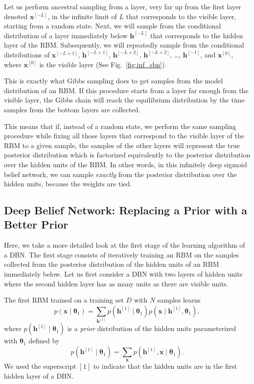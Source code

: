 \documentclass{now}
\newcommand{\qlay}[1]{\left[#1\right]}
\newcommand{\vect}[1]{\mathbf{#1}}
\newcommand{\vects}[1]{\boldsymbol{#1}}
\newcommand{\vh}[0]{\vect{h}}
\newcommand{\vx}[0]{\vect{x}}
\newcommand{\TT}[0]{{\vects{\theta}}}
\begin{document}
Let us perform ancestral sampling from a layer, very far up
from the first layer denoted $\vx^{\qlay{-L}}$, in the infinite
limit of $L$ that corresponds
to the visible layer, starting from a random state.  Next,
we will sample from the conditional distribution of a layer
immediately below $\vh^{\qlay{-L}}$ that corresponds to the
hidden layer of the RBM. Subsequently, we will repeatedly
sample from the conditional distributions of $\vx^{\qlay{-L+1}}$,
$\vh^{\qlay{-L+1}}$, $\vh^{\qlay{-L+2}}$, $\vh^{\qlay{-L+2}}$, \dots,
$\vh^{\qlay{-1}}$, and $\vx^{\qlay{0}}$, where $\vx^{\qlay{0}}$ is the
visible layer (See Fig.~\ref{fig:inf_sbn}). 

This is exactly what Gibbs sampling
does to get samples from the model distribution of an RBM.
If this procedure starts from a layer far enough from the
visible layer, the Gibbs chain will reach the equilibrium
distribution by the time samples from the bottom layers are
collected. 

This means that if, instead of a random state, we perform
the same sampling procedure while fixing all those layers
that correspond to the visible layer of the RBM to a given
sample, the samples of the other layers will represent the
true posterior distribution which is factorized equivalently
to the posterior distribution over the hidden units of the
RBM. In other words, in this infinitely deep sigmoid belief
network, we can sample \textit{exactly} from the posterior
distribution over the hidden units, because the weights are
tied.

\subsection{Deep Belief Network: Replacing a Prior with a
Better Prior}
\label{sec:dbn_rbm}

Here, we take a more detailed look at the first stage of the
learning algorithm of a DBN.
The first stage consists of
iteratively training an RBM on the samples collected from
the posterior distribution of the hidden units of an RBM
immediately below. Let us first consider a DBN with two
layers of hidden units where the second hidden layer has
as many units as there are visible units.

The first RBM trained on a training set $D$ with $N$ samples
learns
\[
p(\vx \mid \TT_1) = \sum_{\vh^{\qlay{1}}} p(\vh^{\qlay{1}}\mid \TT_1) p(\vx \mid
\vh^{\qlay{1}}, \TT_1),
\]
where $p(\vh^{\qlay{1}}\mid \TT_1)$ is a \textit{prior} distribution
of the hidden units parameterized with $\TT_1$ defined by
\[
p(\vh^{\qlay{1}} \mid \TT_1) = \sum_{\vx} p(\vh^{\qlay{1}}, \vx \mid \TT_1).
\]
We used the superscript $\qlay{1}$ to indicate that the hidden
units are in the first hidden layer of a DBN.
\end{document}

